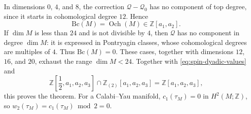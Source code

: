\documentclass[14pt,dvipsnames]{extarticle}
\makeatletter
\numberwithin{equation}{subsection}
\theoremstyle{plain}
\theoremstyle{definition}
\theoremstyle{definition}
\renewenvironment{proof}[1][\proofname]{
 \par\pushQED{\qed}\normalfont
 \topsep6\p@\@plus6\p@\relax
 \trivlist\item[\hskip\labelsep\bfseries\itshape #1\@addpunct{.}]
}{\popQED\endtrivlist\@endpefalse}
\DeclareMathOperator{\Och}{Och}
\newcommand{\Bc}{\mathrm{Bc}}
\newcommand{\Ztwo}{\mathbb{Z}_{(2)}}
\makeatother
\begin{document}
\begin{proof}[Proof of \cref{thm:bc-spin-below24}]
In dimensions $0$, $4$, and $8$, the correction
$\mathcal Q-\mathcal Q_0$ has no component of top degree, since it starts in
cohomological degree $12$. Hence
\[
 \Bc(M)=\Och(M)\in\mathbb Z[a_1,a_2].
\]
If $\dim M$ is less than $24$ and is not divisible by $4$, then $\mathcal Q$
has no component in degree $\dim M$: it is expressed in Pontryagin classes, whose
cohomological degrees are multiples of $4$. Thus $\Bc(M)=0$.
These cases, together with dimensions $12$, $16$, and $20$, exhaust the
range $\dim M<24$.
Together with \eqref{eq:spin-dyadic-values} and
\[
 \mathbb Z\!\left[\frac12,a_1,a_2,a_3\right]
 \cap\Ztwo[a_1,a_2,a_3]=\mathbb Z[a_1,a_2,a_3],
\]
this proves the theorem. For a Calabi--Yau manifold, $c_1(\tau_M)=0$ in $H^2(M;\mathbb Z)$, so
$w_2(\tau_M)=c_1(\tau_M)\bmod2=0$.
\end{proof}
\end{document}
